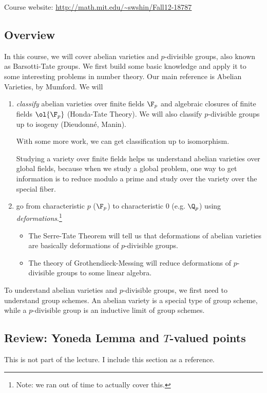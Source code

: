 
Course website: \url{http://math.mit.edu/\~swshin/Fall12-18787}

\subsection{Overview}

In this course, we will cover abelian varieties and $p$-divisible groups, also known as Barsotti-Tate groups. We first build some basic knowledge and apply it to some interesting problems in number theory. Our main reference is Abelian Varieties, by Mumford. We will
\begin{enumerate}
\item
{\it classify} abelian varieties over finite fields $\F_p$ and algebraic closures  of finite fields $\ol{\F_p}$ (Honda-Tate Theory). We will also classify $p$-divisible groups up to isogeny (Dieudonn\'e, Manin).

With some more work, we can get classification up to isomorphism.

Studying a variety over finite fields helps us understand abelian varieties over global fields, because when we study a global problem, one way to get information is to reduce modulo a prime and study over the variety over the special fiber.

\item
go from characteristic $p$ ($\F_p$) to characteristic 0 (e.g. $\Q_p$) using {\it deformations}.\footnote{Note: we ran out of time to actually cover this.}
\begin{itemize}
\item
The Serre-Tate Theorem will tell us that deformations of abelian varieties are basically deformations of $p$-divisible groups.
\item
The theory of Grothendieck-Messing will reduce deformations of $p$-divisible groups to some linear algebra.
\end{itemize}
\end{enumerate}
To understand abelian varieties and $p$-divisible groups, we first need to understand group schemes. An abelian variety is a special type of group scheme, while a $p$-divisible group is an inductive limit of group schemes.

\subsection{Review: Yoneda Lemma and $T$-valued points}
This is not part of the lecture. I include this section as a reference.
